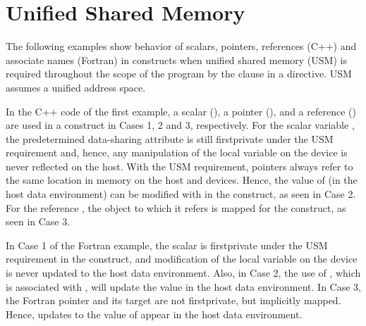 \pagebreak
\section{Unified Shared Memory}
\label{sec:usm}



The following examples show behavior of scalars, pointers, references (C++) and 
associate names (Fortran) in  constructs when
unified shared memory (USM) is required throughout the scope of the program by the 
 clause in a  directive.
USM assumes a unified address space.

\begin{cppspecific}
In the C++ code of the first example, a scalar (), a pointer 
(), and a reference () are used in a  construct in Cases 1, 2 and 3, respectively.
For the scalar variable , the predetermined data-sharing attribute is still
firstprivate under the USM requirement and, hence, any manipulation of the local variable on the device is never reflected on the host.
With the USM requirement, pointers always refer to the same location in memory on the host and devices.
Hence, the value of  (in the host data environment) can be modified with  in 
the  construct, as seen in Case 2. 
For the reference , the object to which it refers is mapped for  
the  construct, as seen in Case 3. 

\end{cppspecific}

\begin{fortranspecific}
In Case 1 of the Fortran example, the scalar  is firstprivate under the USM requirement
in the  construct, and modification of the local variable on the device is 
never updated to the host data environment.
Also, in Case 2, the use of , which is associated with , 
will update the  value in the host data environment.
In Case 3, the Fortran pointer  and its target  are not firstprivate, 
but implicitly mapped.  Hence, updates to the value of  appear in the host data environment.


{}
\end{fortranspecific}
